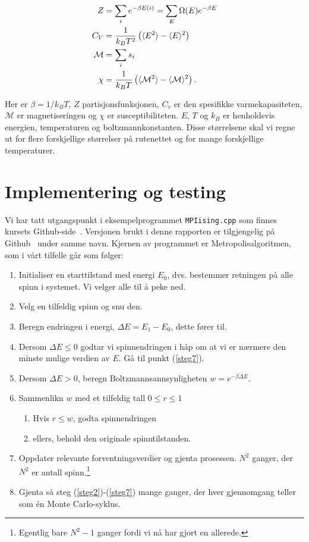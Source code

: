 \documentclass[11pt]{article}
\begin{document}
\begin{align}
Z &= \sum_i e^{-\beta E(i)} = \sum_E \Omega(E) e^{-\beta E}\label{eq:partisjons-funk} \\
C_V &= \frac{ 1 }{ k_B T^2} \left( \langle E^2 \rangle-\langle E \rangle^2 \right)\label{eq:spesifikk-varmekapasitet} \\
\mathcal{M} &= \sum_i s_i\label{eq:magnetisering} \\
\chi &= \frac{ 1 }{ k_BT } \left( \langle \mathcal{M}^2 \rangle - \langle \mathcal{M} \rangle^2 \right)\label{eq:susceptibilitet}.
\end{align}

Her er $\beta = 1/k_BT$, $Z$ partisjonsfunksjonen, $C_v$ er den spesifikke varmekapasiteten,
$\mathcal{M}$ er magnetiseringen og $\chi$ er susceptibiliteten. $E$, $T$ og $k_B$ er henholdsvis 
energien, temperaturen og boltzmannkonstanten. Disse størrelsene skal vi regne ut for flere forskjellige
størrelser på rutenettet og for mange forskjellige temperaturer.

\section{Implementering og testing}

Vi har tatt utgangspunkt i eksempelprogrammet \texttt{MPIising.cpp}
som finnes kursets Github-side~\cite{compphys-github}. Versjonen brukt
i denne rapporten er tilgjengelig på Github~\cite{github-repo} under samme navn. Kjernen av
programmet er Metropolisalgoritmen, som i vårt tilfelle går som følger: 

\begin{enumerate}
\item Initialiser en starttilstand med energi $E_0$, dvs. bestemmer retningen på
  alle spinn i systemet. Vi velger alle til å peke ned.
\item Velg en tilfeldig spinn og snu den.\label{steg2}
\item Beregn endringen i energi, $\Delta E = E_1-E_0$, dette fører til.\label{steg3} 
\item Dersom $\Delta E \leq 0$ godtar vi spinnendringen i håp om at vi
  er nærmere den minste mulige verdien av $E$. Gå til punkt (\ref{steg7}).
\item Dersom $\Delta E > 0 $, beregn Boltzmannsannsynligheten $w =
  e^{-\beta\Delta E}$. 
\item Sammenlikn $w$ med et tilfeldig tall $0\leq r\leq 1$ \label{steg6}
\begin{enumerate}
  \item Hvis $r\leq w$, godta spinnendringen
  \item ellers, behold den originale spinntilstanden.
\end{enumerate}
\item Oppdater relevante forventningsverdier og gjenta prosessen.\label{steg7}
  $N^2$ ganger, der $N^2$ er antall spinn.\footnote{Egentlig bare $N^2-1$ ganger fordi vi nå har gjort en
  allerede.}
\item Gjenta så steg (\ref{steg2})-(\ref{steg7}) mange ganger, der hver gjennomgang teller som
  én Monte Carlo-syklus.
\end{enumerate}
\end{document}
